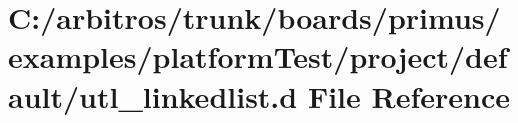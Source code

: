\hypertarget{boards_2primus_2examples_2platform_test_2project_2default_2utl__linkedlist_8d}{\section{C\-:/arbitros/trunk/boards/primus/examples/platform\-Test/project/default/utl\-\_\-linkedlist.d File Reference}
\label{boards_2primus_2examples_2platform_test_2project_2default_2utl__linkedlist_8d}
}
